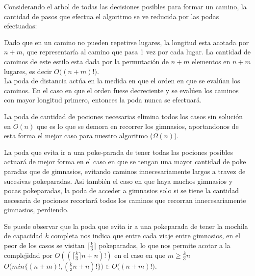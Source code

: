 Considerando el arbol de todas las decisiones posibles para formar un camino, la cantidad de pasos que efectua el algoritmo se ve reducida por las podas efectuadas:

Dado que en un camino no pueden repetirse lugares, la longitud esta acotada por $n+m$, que representaría al camino que pasa 1 vez por cada lugar. La cantidad de caminos de este estilo esta dada por la permutación de $n+m$ elementos en $n+m$ lugares, es decir $O\Big ( (n+m)! \Big)$.\\

La poda de distancia actúa en la medida en que el orden en que se evalúan los caminos. En el caso en que el orden fuese decreciente y se evalúen los caminos con mayor longitud primero, entonces la poda nunca se efectuará.

La poda de cantidad de pociones necesarias elimina todos los casos sin solución en $O(n)$ que es lo que se demora en recorrer los gimnasios, aportandonos de esta forma el mejor caso para nuestro algoritmo ($\Omega(n)$).

La poda que evita ir a una poke-parada de tener todas las pociones posibles actuará de mejor forma en el caso en que se tengan una mayor cantidad de poke paradas que de gimnasios, evitando caminos innecesariamente largos a travez de sucesivas pokeparadas. Asi también el caso en que haya muchos gimnasios y pocas pokeparadas, la poda de acceder a gimnasios solo si se tiene la cantidad necesaria de pociones recortará todos los caminos que recorran innecesariamente gimnasios, perdiendo. 

Se puede observar que la poda que evita ir a una pokeparada de tener la mochila de capacidad $k$ completa nos indica que entre cada viaje entre gimnasios, en el peor de los casos se visitan $\lceil{\frac{k}{3}}\rceil$ pokeparadas, lo que nos permite acotar a la complejidad por $O((\lceil{\frac{k}{3}}\rceil n + n)!)$ en el caso en que $m\geq\frac{k}{3}n$ $O\Big(min\big\{ (n+m)!, (\frac{k}{3}n + n)! \big\}\Big) \in O\big((n+m)!\big)$.
 